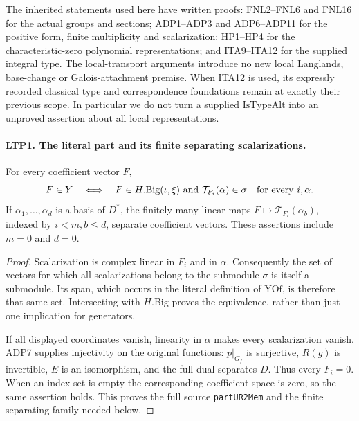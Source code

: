The inherited statements used here have written proofs: FNL2--FNL6
and FNL16 for the actual groups and sections; ADP1--ADP3 and
ADP6--ADP11 for the positive form, finite multiplicity and
scalarization; HP1--HP4 for the characteristic-zero polynomial
representations; and ITA9--ITA12 for the supplied integral type.
The local-transport arguments introduce no new local Langlands,
base-change or Galois-attachment premise.  When ITA12 is used, its
expressly recorded classical type and correspondence foundations
remain at exactly their previous scope.  In particular we do not
turn a supplied \(\mathrm{IsTypeAlt}\) into an unproved assertion
about all local representations.

\paragraph{LTP1. The literal part and its finite separating scalarizations.}
\label{claim:LTP1}
For every coefficient vector \(F\),
\[
 F\in Y
 \quad\Longleftrightarrow\quad
 F\in H.\mathrm{Big}(\iota,\xi)
       \ \hbox{and}\ 
 \mathcal T_{F_i}(\alpha)\in\sigma
                  \quad\hbox{for every }i,\alpha .
\]
If \(\alpha_1,\ldots,\alpha_d\) is a basis of \(D^*\), the finitely
many linear maps
\(F\mapsto\mathcal T_{F_i}(\alpha_b)\), indexed by \(i<m,b\le d\),
separate coefficient vectors.  These assertions include \(m=0\)
and \(d=0\).
\begin{proof}
Scalarization is complex linear in \(F_i\) and in \(\alpha\).
Consequently the set of vectors for which all scalarizations belong
to the submodule \(\sigma\) is itself a submodule.  Its span, which
occurs in the literal definition of \(\mathrm{YOf}\), is therefore
that same set.  Intersecting with \(H.\mathrm{Big}\) proves the
equivalence, rather than just one implication for generators.

If all displayed coordinates vanish, linearity in \(\alpha\) makes
every scalarization vanish.  ADP7 supplies injectivity on the original
functions: \(p|_{G_f}\) is surjective, \(R(g)\) is invertible, \(E\)
is an isomorphism, and the full dual separates \(D\).  Thus every
\(F_i=0\).  When an index set is empty the corresponding coefficient
space is zero, so the same assertion holds.  This proves the full
source \texttt{partUR2Mem} and the finite separating family needed
below.
\end{proof}


